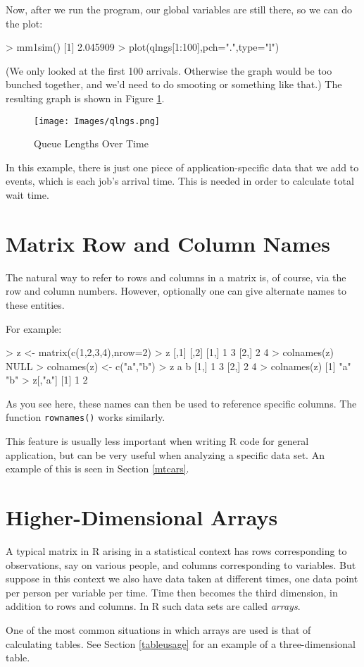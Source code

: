 Now, after we run the program, our global variables are still there, so
we can do the plot:

\begin{Code}
> mm1sim()
[1] 2.045909
> plot(qlngs[1:100],pch=".",type="l")
\end{Code}

\noindent
(We only looked at the first 100 arrivals.  Otherwise the graph would be
too bunched together, and we'd need to do smooting or something like
that.) The resulting graph is shown in Figure \ref{qlngs}.

\begin{figure}[tp]
   \texttt{[image: Images/qlngs.png]}
   \caption{Queue Lengths Over Time}
   \label{qlngs}
\end{figure}

In this example, there is just one piece of application-specific data
that we add to events, which is each job's arrival time.  This is needed
in order to calculate total wait time.

\section{Matrix Row and Column Names}

The natural way to refer to rows and columns in a matrix is, of course,
via the row and column numbers.  However, optionally one can give
alternate names to these entities.

For example:

\begin{Code}
> z <- matrix(c(1,2,3,4),nrow=2)
> z
     [,1] [,2]
[1,]    1    3
[2,]    2    4
> colnames(z)
NULL
> colnames(z)  <- c("a","b")
> z
     a b
[1,] 1 3
[2,] 2 4
> colnames(z)
[1] "a" "b"
> z[,"a"]
[1] 1 2
\end{Code}

\noindent
As you see here, these names can then be used to reference specific
columns.  The function {\tt rownames()} works similarly.

This feature is usually less important when writing R code for general
application, but can be very useful when analyzing a specific data set.
An example of this is seen in Section \ref{mtcars}.

\section{Higher-Dimensional Arrays}

A typical matrix in R arising in a statistical context has rows
corresponding to observations, say on various people, and columns
corresponding to variables.  But suppose in this context we also have
data taken at different times, one data point per person per variable
per time.  Time then becomes the third dimension, in addition to rows
and columns.  In R such data sets are called {\it arrays}.

One of the most common situations in which arrays are used is that of
calculating tables.  See Section \ref{tableusage} for an example of a
three-dimensional table.
